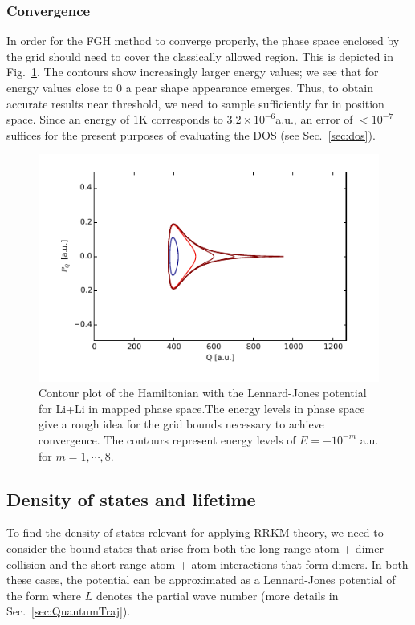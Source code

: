 \documentclass[%
 reprint,
 amsmath,amssymb,
 aps,
 nofootinbib
]{revtex4-1}
\begin{document}
\subsubsection{{\label{sec:fgh-psa}}Convergence}

In order for the FGH method to converge properly, the phase space enclosed by the grid should need to cover the classically allowed region. This is depicted in Fig.~\ref{fig:psa}. The contours show increasingly larger energy values; we see that for energy values close to $0$ a pear shape appearance emerges. Thus, to obtain accurate results near threshold, we need to sample sufficiently far in position space. Since an energy of $1$K corresponds to $3.2\times 10^{-6}$a.u., an error of $<10^{-7}$ suffices for the present purposes of evaluating the DOS (see Sec.~\ref{sec:dos}).

\begin{figure}
\includegraphics{figures/psa}
\caption{\label{fig:psa}Contour plot of the Hamiltonian with the Lennard-Jones potential for Li+Li in mapped phase space.The energy levels in phase space give a rough idea for the grid bounds necessary to achieve convergence. The contours represent energy levels of $E = -10^{-m}$ a.u. for $m=1,\cdots,8$.}
\end{figure}


\subsection{\label{sec:dos}Density of states and lifetime}

To find the density of states relevant for applying RRKM theory, we need to consider the bound states that arise from both the long range atom + dimer collision and the short range atom + atom interactions that form dimers. In both these cases, the potential can be approximated as a Lennard-Jones potential of the form
where $L$ denotes the partial wave number (more details in Sec.~\ref{sec:QuantumTraj}).
\end{document}
